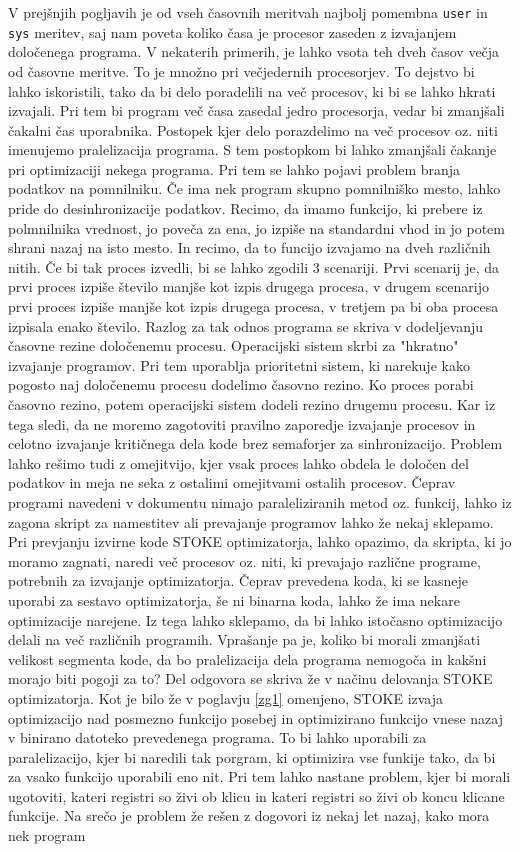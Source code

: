\documentclass[a4paper, 12pt]{book}
\begin{document}
V prejšnjih pogljavih je od vseh časovnih meritvah najbolj pomembna \texttt{user} in \texttt{sys} meritev, saj nam poveta koliko časa je procesor zaseden z izvajanjem določenega programa. V nekaterih primerih, je lahko vsota teh dveh časov večja od  časovne meritve. To je množno pri večjedernih procesorjev. To dejstvo bi lahko iskoristili, tako da bi delo poradelili na več procesov, ki bi se lahko hkrati izvajali. Pri tem bi program več časa zasedal jedro procesorja, vedar bi zmanjšali čakalni čas uporabnika. Postopek kjer delo porazdelimo na več procesov oz. niti imenujemo pralelizacija programa. S tem postopkom bi lahko zmanjšali čakanje pri optimizaciji nekega programa. Pri tem se lahko pojavi problem branja podatkov na pomnilniku. Če ima nek program skupno pomnilniško mesto, lahko pride do desinhronizacije podatkov. Recimo, da imamo funkcijo, ki prebere iz polmnilnika vrednost, jo poveča za ena, jo izpiše na standardni vhod in jo potem shrani nazaj na isto mesto. In recimo, da to funcijo izvajamo na dveh različnih nitih. Če bi tak proces izvedli, bi se lahko zgodili 3 scenariji. Prvi scenarij je, da prvi proces izpiše število manjše kot izpis drugega procesa, v drugem scenarijo prvi proces izpiše manjše kot izpis drugega procesa, v tretjem pa bi oba procesa izpisala enako število. Razlog za tak odnos programa se skriva v dodeljevanju časovne rezine določenemu procesu. Operacijski sistem skrbi za "hkratno" izvajanje programov. Pri tem uporablja prioritetni sistem, ki narekuje kako pogosto naj določenemu procesu dodelimo časovno rezino. Ko proces porabi časovno rezino, potem operacijski sistem dodeli rezino drugemu procesu. Kar iz tega sledi, da ne moremo zagotoviti pravilno zaporedje izvajanje procesov in celotno izvajanje kritičnega dela kode brez semaforjer za sinhronizacijo. Problem lahko rešimo tudi z omejitvijo, kjer vsak proces lahko obdela le določen del podatkov in meja ne seka z ostalimi omejitvami ostalih procesov. Čeprav programi navedeni v dokumentu nimajo paraleliziranih metod oz. funkcij, lahko iz zagona skript za namestitev ali prevajanje programov lahko že nekaj sklepamo. Pri prevjanju izvirne kode STOKE optimizatorja, lahko opazimo, da skripta, ki jo moramo zagnati, naredi več procesov oz. niti, ki prevajajo različne programe, potrebnih za izvajanje optimizatorja. Čeprav prevedena koda, ki se kasneje uporabi za sestavo optimizatorja, še ni binarna koda, lahko že ima nekare optimizacije narejene. Iz tega lahko sklepamo, da bi lahko istočasno optimizacijo delali na več različnih programih. Vprašanje pa je, koliko bi morali zmanjšati velikost segmenta kode, da bo pralelizacija dela programa nemogoča in kakšni morajo biti pogoji za to? Del odgovora se skriva že v načinu delovanja STOKE optimizatorja. Kot je bilo že v poglavju \ref{zg1} omenjeno, STOKE izvaja optimizacijo nad posmezno funkcijo posebej in optimizirano funkcijo vnese nazaj v binirano datoteko prevedenega programa. To bi lahko uporabili za paralelizacijo, kjer bi naredili tak porgram, ki optimizira vse funkije tako, da bi za vsako funkcijo uporabili eno nit. Pri tem lahko nastane problem, kjer bi morali ugotoviti, kateri registri so živi ob klicu in kateri registri so živi ob koncu klicane funkcije. Na srečo je problem že rešen z dogovori iz nekaj let nazaj, kako mora nek program 
\end{document}
